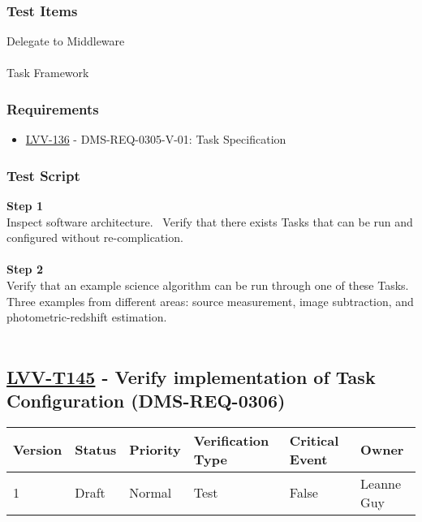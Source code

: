 \hypertarget{test-items-44}{%
\subsubsection{Test Items}\label{test-items-44}}

Delegate to Middleware\\
~\\
Task Framework

\hypertarget{requirements-44}{%
\subsubsection{Requirements}\label{requirements-44}}

\begin{itemize}
\tightlist
\item
  \href{https://jira.lsstcorp.org/browse/LVV-136}{LVV-136} -
  DMS-REQ-0305-V-01: Task Specification
\end{itemize}

\hypertarget{test-script-44}{%
\subsubsection{Test Script}\label{test-script-44}}

\textbf{Step 1}\\
Inspect software architecture. ~Verify that there exists Tasks that can
be run and configured without re-complication.\\
~\\
\textbf{Step 2}\\
Verify that an example science algorithm can be run through one of these
Tasks.~ Three examples from different areas: source measurement, image
subtraction, and photometric-redshift estimation.\\
~\\

\hypertarget{lvv-t145---verify-implementation-of-task-configuration-dms-req-0306}{%
\subsection{\texorpdfstring{\href{https://jira.lsstcorp.org/secure/Tests.jspa\#/testCase/LVV-T145}{LVV-T145}
- Verify implementation of Task Configuration
(DMS-REQ-0306)}{LVV-T145 - Verify implementation of Task Configuration (DMS-REQ-0306)}}\label{lvv-t145---verify-implementation-of-task-configuration-dms-req-0306}}

\begin{longtable}[]{@{}llllll@{}}
\toprule
Version & Status & Priority & Verification Type & Critical Event &
Owner\tabularnewline
\midrule
\endhead
1 & Draft & Normal & Test & False & Leanne Guy\tabularnewline
\bottomrule
\end{longtable}

